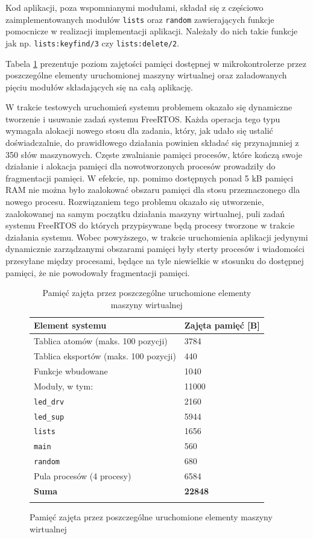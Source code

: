 Kod aplikacji, poza wspomnianymi modułami, składał się z częściowo zaimplementowanych modułów \texttt{lists} oraz \texttt{random} zawierających funkcje pomocnicze w realizacji implementacji aplikacji.
Należały do nich takie funkcje jak np. \texttt{lists:keyfind/3} czy \texttt{lists:delete/2}.

Tabela \ref{table:ledMemory} prezentuje poziom zajętości pamięci dostępnej w mikrokontrolerze przez poszczególne elementy uruchomionej maszyny wirtualnej oraz załadowanych pięciu modułów składających się na całą aplikację.

W trakcie testowych uruchomień systemu problemem okazało się dynamiczne tworzenie i usuwanie zadań systemu FreeRTOS.
Każda operacja tego typu wymagała alokacji nowego stosu dla zadania, który, jak udało się ustalić doświadczalnie, do prawidłowego działania powinien składać się przynajmniej z 350 słów maszynowych.
Częste zwalnianie pamięci procesów, które kończą swoje działanie i alokacja pamięci dla nowotworzonych procesów prowadziły do fragmentacji pamięci. W efekcie, np. pomimo dostępnych ponad 5 kB pamięci RAM nie można było zaalokować obszaru pamięci dla stosu przeznaczonego dla nowego procesu.
Rozwiązaniem tego problemu okazało się utworzenie, zaalokowanej na samym początku działania maszyny wirtualnej, puli zadań systemu FreeRTOS do których przypisywane będą procesy tworzone w trakcie działania systemu.
Wobec powyższego, w trakcie uruchomienia aplikacji jedynymi dynamicznie zarządzanymi obszarami pamięci były sterty procesów i wiadomości przesyłane między procesami, będące na tyle niewielkie w stosunku do dostępnej pamięci, że nie powodowały fragmentacji pamięci.

\begin{figure}[h]
\begin{longtable}{|l|l|}
\hline

\textbf{Element systemu} & \textbf{Zajęta pamięć [B]} \\
\endfirsthead
\hline
Tablica atomów (maks. 100 pozycji) & 3784 \\
\hline
Tablica eksportów (maks. 100 pozycji) & 440 \\
\hline
Funkcje wbudowane & 1040 \\
\hline
Moduły, w tym: & 11000 \\
{\small \texttt{led\_drv}} & {\small 2160} \\
{\small \texttt{led\_sup}} & {\small 5944} \\
{\small \texttt{lists}} & {\small 1656} \\
{\small \texttt{main}} & {\small 560} \\
{\small \texttt{random}} & {\small 680} \\
\hline
Pula procesów (4 procesy) & 6584 \\
\hline
\textbf{Suma} & \textbf{22848} \\
\hline

\caption{Pamięć zajęta przez poszczególne uruchomione elementy maszyny wirtualnej} 
\label{table:ledMemory} \\
\end{longtable}
\end{figure}

